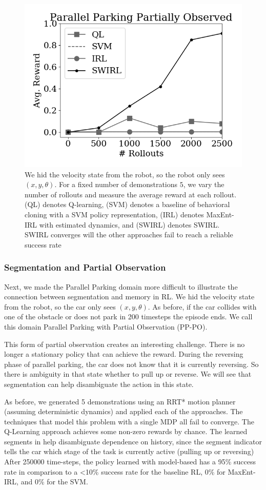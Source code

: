 \begin{figure}[t]
\centering
 \includegraphics[width=0.8\columnwidth]{swirl-experiments/pp-po.png}
 \caption{We hid the velocity state from the robot, so the robot only sees $(x,y,\theta)$. For a fixed number of demonstrations $5$, we vary the number of rollouts and measure the average reward at each rollout. (QL) denotes Q-learning, (SVM) denotes a baseline of behavioral cloning with a SVM policy representation, (IRL) denotes MaxEnt-IRL with estimated dynamics, and (SWIRL) denotes SWIRL. SWIRL converges will the other approaches fail to reach a reliable success rate \label{exp:pp-po}}
\end{figure}

\subsubsection{Segmentation and Partial Observation}
Next, we made the Parallel Parking domain more difficult to illustrate the connection between segmentation and memory in RL. 
We hid the velocity state from the robot, so the car only sees $(x,y,\theta)$. 
As before, if the car collides with one of the obstacle or does not park in 200 timesteps the episode ends.
We call this domain Parallel Parking with Partial Observation (PP-PO).

This form of partial observation creates an interesting challenge.
There is no longer a stationary policy that can achieve the reward.
During the reversing phase of parallel parking, the car does not know that it is currently reversing.
So there is ambiguity in that state whether to pull up or reverse.
We will see that segmentation can help disambiguate the action in this state.

As before, we generated 5 demonstrations using an RRT* motion planner (assuming deterministic dynamics) and applied each of the approaches.
The techniques that model this problem with a single MDP all fail to converge.
The Q-Learning approach achieves some non-zero rewards by chance.
The learned segments in \hirl help disambiguate dependence on history, since the segment indicator tells the car which stage of the task is currently active (pulling up or reversing)
After 250000 time-steps, the policy learned with model-based \hirl has a 95\% success rate in comparison to a <10\% success rate for the baseline RL, 0\% for MaxEnt-IRL, and 0\% for the SVM.




